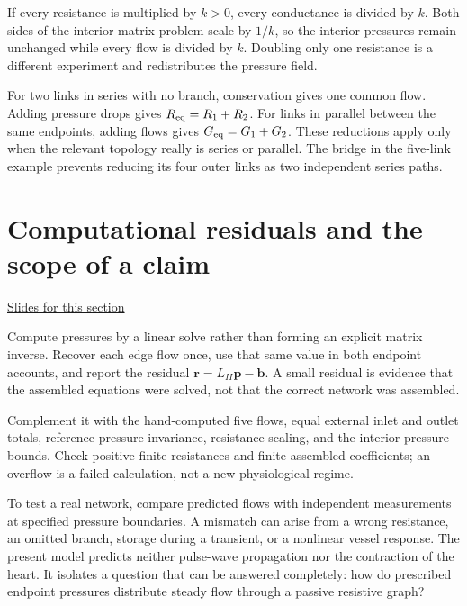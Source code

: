 \documentclass[11pt,letterpaper]{article}
\theoremstyle{definition}\newtheorem{definition}{Definition}\newtheorem{example}{Example}
\numberwithin{equation}{section}
\begin{document}
If every resistance is multiplied by $k>0$, every conductance is divided by $k$. Both sides of the interior matrix problem scale by $1/k$, so the interior pressures remain unchanged while every flow is divided by $k$. Doubling only one resistance is a different experiment and redistributes the pressure field.

For two links in series with no branch, conservation gives one common flow. Adding pressure drops gives $R_{\rm eq}=R_1+R_2$. For links in parallel between the same endpoints, adding flows gives $G_{\rm eq}=G_1+G_2$. These reductions apply only when the relevant topology really is series or parallel. The bridge in the five-link example prevents reducing its four outer links as two independent series paths.
\section{Computational residuals and the scope of a claim}
\hypertarget{note-computational-residuals-and-the-scope-of-a-claim}{}\label{note:computational-residuals-and-the-scope-of-a-claim}
{\small \href{slides.html\#frame=a-numerical-residual-is-necessary\&step=1}{Slides for this section}}\par
Compute pressures by a linear solve rather than forming an explicit matrix inverse. Recover each edge flow once, use that same value in both endpoint accounts, and report the residual $\mathbf r=L_{II}\mathbf p-\mathbf b$. A small residual is evidence that the assembled equations were solved, not that the correct network was assembled.

Complement it with the hand-computed five flows, equal external inlet and outlet totals, reference-pressure invariance, resistance scaling, and the interior pressure bounds. Check positive finite resistances and finite assembled coefficients; an overflow is a failed calculation, not a new physiological regime.

To test a real network, compare predicted flows with independent measurements at specified pressure boundaries. A mismatch can arise from a wrong resistance, an omitted branch, storage during a transient, or a nonlinear vessel response. The present model predicts neither pulse-wave propagation nor the contraction of the heart. It isolates a question that can be answered completely: how do prescribed endpoint pressures distribute steady flow through a passive resistive graph?
\bigskip
\end{document}
